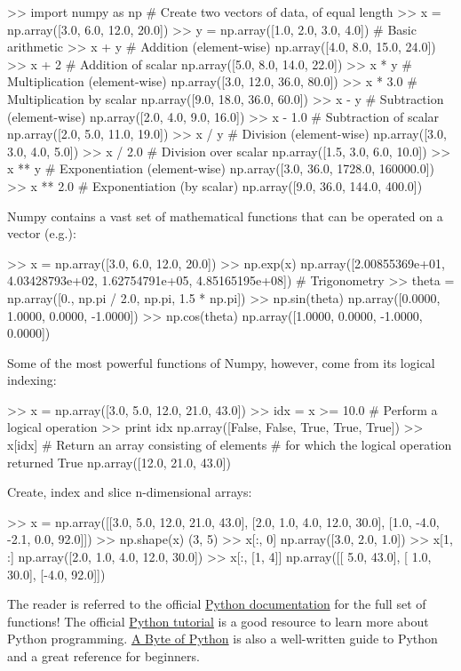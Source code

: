 \begin{python}[frame=single]
>> import numpy as np
# Create two vectors of data, of equal length
>> x = np.array([3.0, 6.0, 12.0, 20.0])
>> y = np.array([1.0, 2.0, 3.0, 4.0])
# Basic arithmetic
>> x + y   # Addition (element-wise)
np.array([4.0, 8.0, 15.0, 24.0])
>> x + 2   # Addition of scalar
np.array([5.0, 8.0, 14.0, 22.0])
>> x * y   # Multiplication (element-wise)
np.array([3.0, 12.0, 36.0, 80.0])
>> x * 3.0   # Multiplication by scalar
np.array([9.0, 18.0, 36.0, 60.0])
>> x - y   # Subtraction (element-wise)
np.array([2.0, 4.0, 9.0, 16.0])
>> x - 1.0   # Subtraction of scalar
np.array([2.0, 5.0, 11.0, 19.0])
>> x / y   # Division (element-wise)
np.array([3.0, 3.0, 4.0, 5.0])
>> x / 2.0   # Division over scalar
np.array([1.5, 3.0, 6.0, 10.0])
>> x ** y    # Exponentiation (element-wise)
np.array([3.0, 36.0, 1728.0, 160000.0])
>> x ** 2.0   # Exponentiation (by scalar)
np.array([9.0, 36.0, 144.0, 400.0])
\end{python}

Numpy contains a vast set of mathematical functions that can be operated on a vector (e.g.):

\begin{python}[frame=single]
>> x = np.array([3.0, 6.0, 12.0, 20.0])
>> np.exp(x)
np.array([2.00855369e+01, 4.03428793e+02, 1.62754791e+05,
         4.85165195e+08])
# Trigonometry
>> theta = np.array([0., np.pi / 2.0, np.pi, 1.5 * np.pi])
>> np.sin(theta)
np.array([0.0000, 1.0000, 0.0000, -1.0000])
>> np.cos(theta)
np.array([1.0000, 0.0000, -1.0000, 0.0000])
\end{python}

Some of the most powerful functions of Numpy, however, come from its logical indexing:

\begin{python}[frame=single]
>> x = np.array([3.0, 5.0, 12.0, 21.0, 43.0])
>> idx = x >= 10.0   # Perform a logical operation
>> print idx
np.array([False, False, True, True, True])
>> x[idx]   # Return an array consisting of elements
            # for which the logical operation returned True
np.array([12.0, 21.0, 43.0])
\end{python}

Create, index and slice n-dimensional arrays:

\begin{python}[frame=single]
>> x = np.array([[3.0,  5.0, 12.0, 21.0, 43.0],
                 [2.0,  1.0,  4.0, 12.0, 30.0],
                 [1.0, -4.0, -2.1,  0.0, 92.0]])
>> np.shape(x)
(3, 5)
>> x[:, 0]
np.array([3.0, 2.0, 1.0])
>> x[1, :]
np.array([2.0, 1.0, 4.0, 12.0, 30.0])
>> x[:, [1, 4]]
np.array([[ 5.0, 43.0],
          [ 1.0, 30.0],
          [-4.0, 92.0]])
\end{python}

The reader is referred to the official \href{https://docs.python.org/2/}{Python documentation} for the full set of functions! The official \href{https://docs.python.org/2/tutorial/}{Python tutorial} is a good resource to learn more about Python programming. \href{http://www.swaroopch.com/notes/python/}{A Byte of Python} is also a well-written guide to Python and a great reference for beginners.